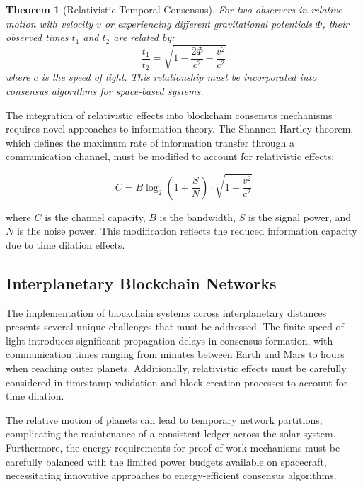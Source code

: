 \documentclass[12pt]{report}
\newtheorem{theorem}{Theorem}
\begin{document}
\begin{theorem}[Relativistic Temporal Consensus]
For two observers in relative motion with velocity \( v \) or experiencing different gravitational potentials \( \Phi \), their observed times \( t_1 \) and \( t_2 \) are related by:
\begin{equation}
\frac{t_1}{t_2} = \sqrt{1 - \frac{2\Phi}{c^2} - \frac{v^2}{c^2}}
\end{equation}
where \( c \) is the speed of light. This relationship must be incorporated into consensus algorithms for space-based systems.
\end{theorem}

The integration of relativistic effects into blockchain consensus mechanisms requires novel approaches to information theory. The Shannon-Hartley theorem, which defines the maximum rate of information transfer through a communication channel, must be modified to account for relativistic effects:

\begin{equation}
C = B \log_2 \left(1 + \frac{S}{N}\right) \cdot \sqrt{1 - \frac{v^2}{c^2}}
\end{equation}

where \( C \) is the channel capacity, \( B \) is the bandwidth, \( S \) is the signal power, and \( N \) is the noise power. This modification reflects the reduced information capacity due to time dilation effects.

\subsection{Interplanetary Blockchain Networks}
The implementation of blockchain systems across interplanetary distances presents several unique challenges that must be addressed. The finite speed of light introduces significant propagation delays in consensus formation, with communication times ranging from minutes between Earth and Mars to hours when reaching outer planets. Additionally, relativistic effects must be carefully considered in timestamp validation and block creation processes to account for time dilation.

The relative motion of planets can lead to temporary network partitions, complicating the maintenance of a consistent ledger across the solar system. Furthermore, the energy requirements for proof-of-work mechanisms must be carefully balanced with the limited power budgets available on spacecraft, necessitating innovative approaches to energy-efficient consensus algorithms.
\end{document}
